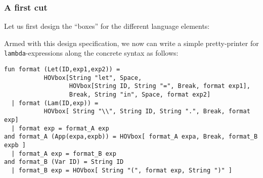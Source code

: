 \subsubsection{A first cut}
Let us first design the ``boxes'' for the different language elements:
Armed with this design specification,
we now can write a simple
pretty-printer for {\tt lambda}-expressions along the
concrete syntax as follows:
\begin{verbatim}
fun format (Let(ID,exp1,exp2)) =
           HOVbox[String "let", Space,
                  HOVbox[String ID, String "=", Break, format exp1],
                  Break, String "in", Space, format exp2]
  | format (Lam(ID,exp)) =
           HOVbox[ String "\\", String ID, String ".", Break, format exp]
  | format exp = format_A exp
and format_A (App(expa,expb)) = HOVbox[ format_A expa, Break, format_B expb ]
  | format_A exp = format_B exp
and format_B (Var ID) = String ID
  | format_B exp = HOVbox[ String "(", format exp, String ")" ]
\end{verbatim}
